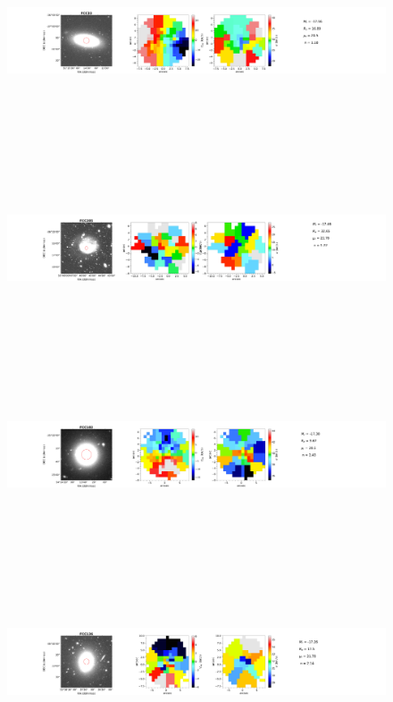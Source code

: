 \documentclass{aa}
\begin{document}
\begin{figure}[!htb]
   \ContinuedFloat
   \centering
   \includegraphics[width=21cm,height=6cm,keepaspectratio]{../2_pipeline/1_V&S_Maps/33Velocity_map.pdf}
   \includegraphics[width=21cm,height=6cm,keepaspectratio]{../2_pipeline/1_V&S_Maps/285Velocity_map.pdf}
   \includegraphics[width=21cm,height=6cm,keepaspectratio]{../2_pipeline/1_V&S_Maps/182Velocity_map.pdf}
   \includegraphics[width=21cm,height=6cm,keepaspectratio]{../2_pipeline/1_V&S_Maps/136Velocity_map.pdf}

\end{figure}
\end{document}
